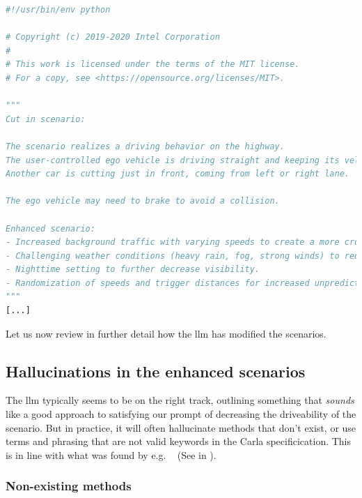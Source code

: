 \begin{lstlisting}[caption={Head of an \acrshort{llm}-enhanced scenario, highlighting how the \acrshort{llm} can add an explenation of how it enhanced the scenario.}, label={lst:llmOutputExplenation}, language={Python}]
#!/usr/bin/env python

# Copyright (c) 2019-2020 Intel Corporation
#
# This work is licensed under the terms of the MIT license.
# For a copy, see <https://opensource.org/licenses/MIT>.

"""
Cut in scenario:

The scenario realizes a driving behavior on the highway.
The user-controlled ego vehicle is driving straight and keeping its velocity at a constant level.
Another car is cutting just in front, coming from left or right lane.

The ego vehicle may need to brake to avoid a collision.

Enhanced scenario:
- Increased background traffic with varying speeds to create a more crowded environment.
- Challenging weather conditions (heavy rain, fog, strong winds) to reduce visibility and grip.
- Nighttime setting to further decrease visibility.
- Randomization of speeds and trigger distances for increased unpredictability.
"""
[...]
\end{lstlisting}

Let us now review in further detail how the \acrshort{llm} has modified the scenarios.

\subsection{Hallucinations in the enhanced scenarios}

The \acrshort{llm} typically seems to be on the right track, outlining something
that \emph{sounds} like a good approach to satisfying our prompt of decreasing
the driveability of the scenario. But in practice, it will often hallucinate
methods that don't exist, or use terms and phrasing that are not valid keywords
in the Carla specificication. This is in line with what was found by e.g.
\citeauthor{autoSceneGen}~\cite[14542]{autoSceneGen} (See  in
).

\subsubsection{Non-existing methods}


